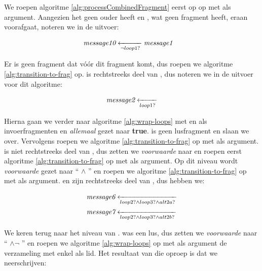 We roepen algoritme \ref{alg:processCombinedFragment} eerst op op met  als argument. Aangezien het geen ouder heeft en , wat geen fragment heeft, eraan voorafgaat, noteren we in de uitvoer:

\begin{align*}
	&\transitionentry[\fragmessage{message1}]{\lnot \fragcond{loop1}}{\fragmessage{message10}}
\end{align*}

Er is geen fragment dat v\'o\'or dit fragment komt, dus roepen we algoritme \ref{alg:transition-to-frag} op.  is rechtstreeks deel van , dus noteren we in de uitvoer voor dit algoritme:

\begin{align*}
	\transitionentry{\fragcond{loop1}}{\fragmessage{message2}}
\end{align*}

Hierna gaan we verder naar algoritme \ref{alg:wrap-loops} met  en  als invoerfragmenten en \textit{allemaal} gezet naar \textbf{true}.  is geen lusfragment en slaan we over. Vervolgens roepen we algoritme \ref{alg:transition-to-frag} op met  als argument.
 is niet rechtstreeks deel van , dus zetten we \textit{voorwaarde} naar  en roepen eerst algoritme \ref{alg:transition-to-frag} op met  als argument. Op dit niveau wordt \textit{voorwaarde} gezet naar `` $\land$ '' en roepen we algoritme \ref{alg:transition-to-frag} op met  als argument.  en  zijn rechtstreeks deel van , dus hebben we:

\begin{align*}
	&\transitionentry{\fragcond{loop2} \land \fragcond{loop3} \land \fragcond{alt2a}}{\fragmessage{message6}} \\
	&\transitionentry{\fragcond{loop2} \land \fragcond{loop3} \land \fragcond{alt2b}}{\fragmessage{message7}}
\end{align*}

We keren terug naar het niveau van .  was een lus, dus zetten we \textit{voorwaarde} naar `` $\land \lnot$ '' en roepen we algoritme \ref{alg:wrap-loops} op met als argument de verzameling met enkel  als lid. Het resultaat van die oproep is dat we neerschrijven:

